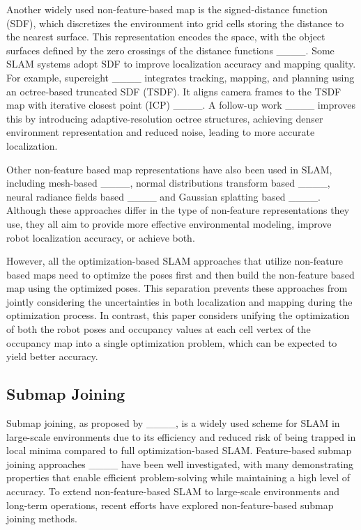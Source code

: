 Another widely used non-feature-based map is the signed-distance function (SDF), which discretizes the environment into grid cells storing the distance to the nearest surface. This representation encodes the space, with the object surfaces defined by the zero crossings of the distance functions ____. Some SLAM systems adopt SDF to improve localization accuracy and mapping quality. For example, supereight ____ integrates tracking, mapping, and planning using an octree-based truncated SDF (TSDF). It aligns camera frames to the TSDF map with iterative closest point (ICP) ____. A follow-up work ____ improves this by introducing adaptive-resolution octree structures, achieving denser environment representation and reduced noise, leading to more accurate localization.

Other non-feature based map representations have also been used in SLAM, including mesh-based ____, normal distributions transform based ____, neural radiance fields based ____ and Gaussian splatting based ____. Although these approaches differ in the type of non-feature representations they use, they all aim to provide more effective environmental modeling, improve robot localization accuracy, or achieve both. 


However, all the optimization-based SLAM approaches that utilize non-feature based maps need to optimize the poses first and then build the non-feature based map using the optimized poses. This separation prevents these approaches from jointly considering the uncertainties in both localization and mapping during the optimization process. In contrast, this paper considers unifying the optimization of both the robot poses and occupancy values at each cell vertex of the occupancy map into a single optimization problem, which can be expected to yield better accuracy.

\subsection{Submap Joining}\label{Sec_related_b}

Submap joining, as proposed by ____, is a widely used scheme for SLAM in large-scale environments due to its efficiency and reduced risk of being trapped in local minima compared to full optimization-based SLAM. Feature-based submap joining approaches ____ have been well investigated, with many demonstrating properties that enable efficient problem-solving while maintaining a high level of accuracy. To extend non-feature-based SLAM to large-scale environments and long-term operations, recent efforts have explored non-feature-based submap joining methods.


